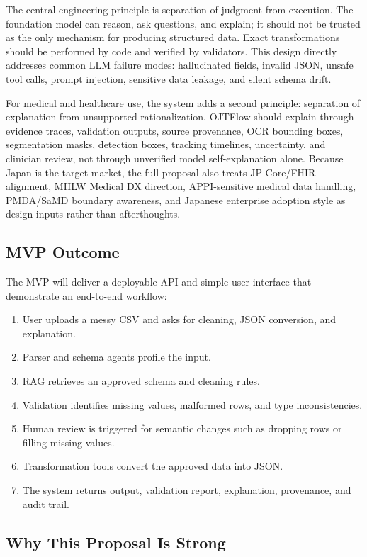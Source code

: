 The central engineering principle is separation of judgment from execution. The foundation model can reason, ask questions, and explain; it should not be trusted as the only mechanism for producing structured data. Exact transformations should be performed by code and verified by validators. This design directly addresses common LLM failure modes: hallucinated fields, invalid JSON, unsafe tool calls, prompt injection, sensitive data leakage, and silent schema drift.

For medical and healthcare use, the system adds a second principle: separation of explanation from unsupported rationalization. OJTFlow should explain through evidence traces, validation outputs, source provenance, OCR bounding boxes, segmentation masks, detection boxes, tracking timelines, uncertainty, and clinician review, not through unverified model self-explanation alone. Because Japan is the target market, the full proposal also treats JP Core/FHIR alignment, MHLW Medical DX direction, APPI-sensitive medical data handling, PMDA/SaMD boundary awareness, and Japanese enterprise adoption style as design inputs rather than afterthoughts.

\subsection{MVP Outcome}

The MVP will deliver a deployable API and simple user interface that demonstrate an end-to-end workflow:

\begin{enumerate}
  \item User uploads a messy CSV and asks for cleaning, JSON conversion, and explanation.
  \item Parser and schema agents profile the input.
  \item RAG retrieves an approved schema and cleaning rules.
  \item Validation identifies missing values, malformed rows, and type inconsistencies.
  \item Human review is triggered for semantic changes such as dropping rows or filling missing values.
  \item Transformation tools convert the approved data into JSON.
  \item The system returns output, validation report, explanation, provenance, and audit trail.
\end{enumerate}

\subsection{Why This Proposal Is Strong}

